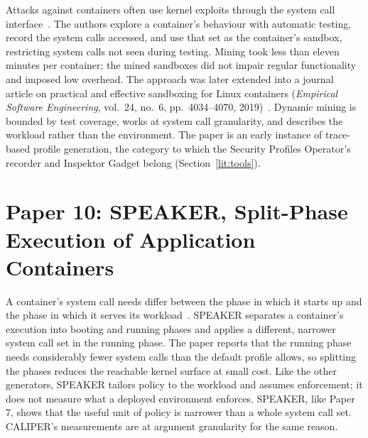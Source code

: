  Attacks against containers often use kernel exploits through the system call interface~\cite{wan2017mining}.
 The authors explore a container's behaviour with automatic testing, record the system calls accessed, and use that set as the container's sandbox, restricting system calls not seen during testing.
 Mining took less than eleven minutes per container; the mined sandboxes did not impair regular functionality and imposed low overhead.
 The approach was later extended into a journal article on practical and effective sandboxing for Linux containers (\emph{Empirical Software Engineering}, vol.~24, no.~6, pp.~4034--4070, 2019)~\cite{wan2019emse}. Dynamic mining is bounded by test coverage, works at system call granularity, and describes the workload rather than the environment.
 The paper is an early instance of trace-based profile generation, the category to which the Security Profiles Operator's recorder and Inspektor Gadget belong (Section~\ref{lit:tools}).

\section{Paper 10: SPEAKER, Split-Phase Execution of Application Containers}
\label{lit:speaker}

 A container's system call needs differ between the phase in which it starts up and the phase in which it serves its workload~\cite{speaker}.
 SPEAKER separates a container's execution into booting and running phases and applies a different, narrower system call set in the running phase.
 The paper reports that the running phase needs considerably fewer system calls than the default profile allows, so splitting the phases reduces the reachable kernel surface at small cost.
 Like the other generators, SPEAKER tailors policy to the workload and assumes enforcement; it does not measure what a deployed environment enforces.
 SPEAKER, like Paper 7, shows that the useful unit of policy is narrower than a whole system call set. CALIPER's measurements are at argument granularity for the same reason.

